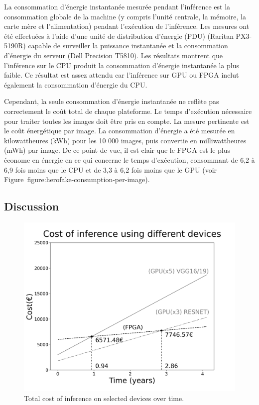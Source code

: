 La consommation d'énergie instantanée mesurée pendant l'inférence est la consommation globale de la machine (y compris l'unité centrale, la mémoire, la carte mère et l'alimentation) pendant l'exécution de l'inférence. 
Les mesures ont été effectuées à l'aide d'une unité de distribution d'énergie (PDU) (Raritan PX3-5190R) capable de surveiller la puissance instantanée et la consommation d'énergie du serveur (Dell Precision T5810). Les résultats montrent que l'inférence sur le CPU produit la consommation d'énergie instantanée la plus faible. Ce résultat est assez attendu car l'inférence sur GPU ou FPGA inclut également la consommation d'énergie du CPU.


Cependant, la seule consommation d'énergie instantanée ne reflète pas correctement le coût total de chaque plateforme. Le temps d'exécution nécessaire pour traiter toutes les images doit être pris en compte. La mesure pertinente est le coût énergétique par image. La consommation d'énergie a été mesurée en kilowattheures (kWh) pour les 10 000 images, puis convertie en milliwattheures (mWh) par image. De ce point de vue, il est clair que le FPGA est le plus économe en énergie en ce qui concerne le temps d'exécution, consommant de 6,2 à 6,9 fois moins que le CPU et de 3,3 à 6,2 fois moins que le GPU (voir Figure~{figure:herofake-consumption-per-image}).

\subsection{Discussion}

\begin{figure}[t]
\centering
\includegraphics[scale=0.2]{5_Chapitre3/figures/characterization/cost_devices_time.png}
\caption{Total cost of inference on selected devices over time.}
\label{figure:herofake-cost-over-time}
\end{figure}

